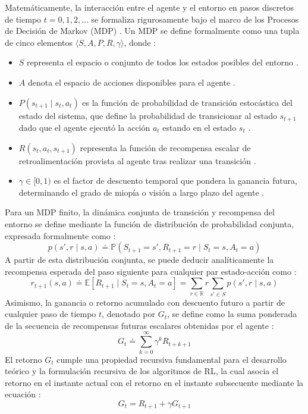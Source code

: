 Matemáticamente, la interacción entre el agente y el entorno en pasos discretos de tiempo $t = 0, 1, 2, \dots$ se formaliza rigurosamente bajo el marco de los Procesos de Decisión de Markov (MDP) \citep{murphy2025reinforcement}. Un MDP se define formalmente como una tupla de cinco elementos $\langle S, A, P, R, \gamma \rangle$, donde \citep{shakya2023reinforcement, murphy2025reinforcement}:
\begin{itemize}
    \item $S$ representa el espacio o conjunto de todos los estados posibles del entorno \citep{murphy2025reinforcement}.
    \item $A$ denota el espacio de acciones disponibles para el agente \citep{murphy2025reinforcement}.
    \item $P(s_{t+1} \mid s_t, a_t)$ es la función de probabilidad de transición estocástica del estado del sistema, que define la probabilidad de transicionar al estado $s_{t+1}$ dado que el agente ejecutó la acción $a_t$ estando en el estado $s_t$ \citep{shakya2023reinforcement}.
    \item $R(s_t, a_t, s_{t+1})$ representa la función de recompensa escalar de retroalimentación provista al agente tras realizar una transición \citep{shakya2023reinforcement, murphy2025reinforcement}.
    \item $\gamma \in [0, 1)$ es el factor de descuento temporal que pondera la ganancia futura, determinando el grado de miopía o visión a largo plazo del agente \citep{murphy2025reinforcement}.
\end{itemize}

Para un MDP finito, la dinámica conjunta de transición y recompensa del entorno se define mediante la función de distribución de probabilidad conjunta, expresada formalmente como \citep{shakya2023reinforcement}:
\begin{equation}
    p(s', r \mid s, a) \doteq \mathbb{P}(S_{t+1} = s', R_{t+1} = r \mid S_t = s, A_t = a)
\end{equation}
A partir de esta distribución conjunta, se puede deducir analíticamente la recompensa esperada del paso siguiente para cualquier par estado-acción como \citep{shakya2023reinforcement}:
\begin{equation}
    r_{t+1}(s, a) \doteq \mathbb{E}[R_{t+1} \mid S_t = s, A_t = a] = \sum_{r \in \mathbb{R}} r \sum_{s' \in S} p(s', r \mid s, a)
\end{equation}
Asimismo, la ganancia o retorno acumulado con descuento futuro a partir de cualquier paso de tiempo $t$, denotado por $G_t$, se define como la suma ponderada de la secuencia de recompensas futuras escalares obtenidas por el agente \citep{shakya2023reinforcement}:
\begin{equation}
    G_t \doteq \sum_{k=0}^{\infty} \gamma^k R_{t+k+1}
\end{equation}
El retorno $G_t$ cumple una propiedad recursiva fundamental para el desarrollo teórico y la formulación recursiva de los algoritmos de RL, la cual asocia el retorno en el instante actual con el retorno en el instante subsecuente mediante la ecuación \citep{shakya2023reinforcement}:
\begin{equation}
    G_t = R_{t+1} + \gamma G_{t+1}
\end{equation}

